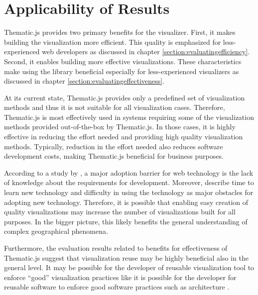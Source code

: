 \section{Applicability of Results}

Thematic.js provides two primary benefits for the visualizer. First, it makes building the visualization more efficient. This quality is emphasized for less-experienced web developers as discussed in chapter \ref{section:evaluatingefficiency}. Second, it enables building more effective visualizations. These characteristics make using the library beneficial especially for less-experienced visualizers as discussed in chapter \ref{section:evaluatingeffectiveness}.

At its current state, Thematic.js provides only a predefined set of visualization methods and thus it is not suitable for all visualization cases. Therefore, Thematic.js is most effectively used in systems requiring some of the visualization methods provided out-of-the-box by Thematic.js. In those cases, it is highly effective in reducing the effort needed and providing high quality visualization methods. Typically, reduction in the effort needed also reduces software development costs, making Thematic.js beneficial for business purposes. 

According to a study by \citet{nambisan_technical_1999}, a major adoption barrier for web technology is the lack of knowledge about the requirements for development. Moreover, \citet{butler_barriers_2002} describe time to learn new technology and difficulty in using the technology as major obstacles for adopting new technology. Therefore, it is possible that enabling easy creation of quality visualizations may increase the number of visualizations built for all purposes. In the bigger picture, this likely benefits the general understanding of complex geographical phenomena.

Furthermore, the evaluation results related to benefits for effectiveness of Thematic.js suggest that visualization reuse may be highly beneficial also in the general level. It may be possible for the developer of reusable visualization tool to enforce ``good'' visualization practices like it is possible for the developer for reusable software to enforce good software practices such as architecture \citep{mohagheghi_quality_2007}.


